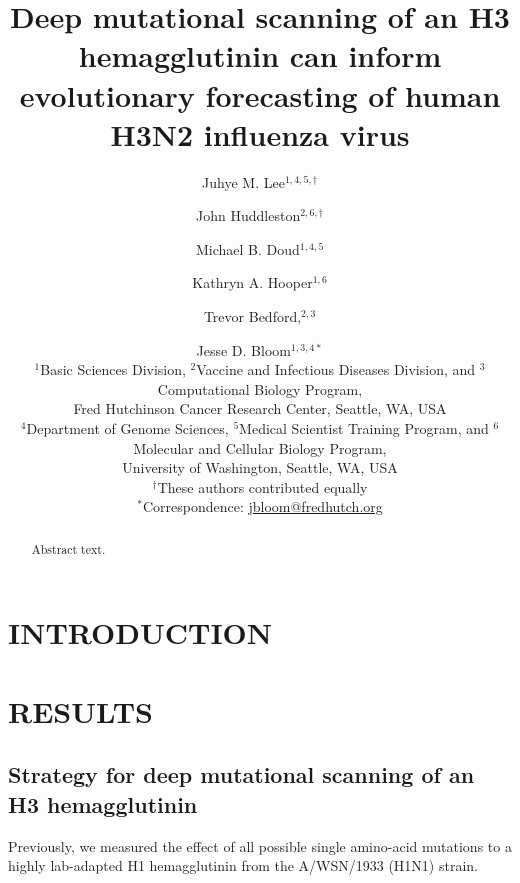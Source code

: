 \documentclass[11pt]{article}
\title{Deep mutational scanning of an H3 hemagglutinin can inform evolutionary forecasting of human H3N2 influenza virus}
\author{
Juhye M. Lee$^{1,4,5,\dagger}$ \and 
John Huddleston$^{2,6,\dagger}$ \and 
Michael B. Doud$^{1,4,5}$ \and 
Kathryn A. Hooper$^{1,6}$ \and
Trevor Bedford,$^{2,3}$ \and 
Jesse D. Bloom$^{1,3,4*}$
\\
\scriptsize{$^1$Basic Sciences Division, $^2$Vaccine and Infectious Diseases Division, and $^3$Computational Biology Program,} \\
\scriptsize{Fred Hutchinson Cancer Research Center, Seattle, WA, USA} \\
\scriptsize{$^4$Department of Genome Sciences, $^5$Medical Scientist Training Program, and $^6$Molecular and Cellular Biology Program,} \\
\scriptsize{University of Washington, Seattle, WA, USA} \\
\scriptsize{$^{\dagger}$These authors contributed equally} \\
\scriptsize{$^*$Correspondence: \href{jbloom@fredhutch.org}{jbloom@fredhutch.org}}
}
\date{}
\begin{document}
\maketitle
\onehalfspacing

\begin{abstract}
Abstract text.
\end{abstract}

\section*{INTRODUCTION}


\section*{RESULTS}
\label{sec:results}

\subsection*{Strategy for deep mutational scanning of an H3 hemagglutinin}
Previously, we measured the effect of all possible single amino-acid mutations to a highly lab-adapted H1 hemagglutinin from the A/WSN/1933 (H1N1) strain. 
\end{document}
